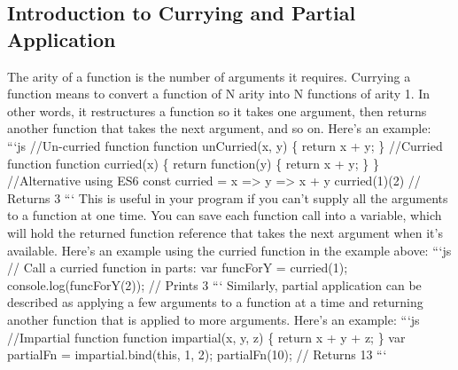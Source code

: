 \documentclass{article}%
\begin{document}
\subsection{Introduction to Currying and Partial Application}%
\label{subsec:IntroductiontoCurryingandPartialApplication}%
The arity of a function is the number of arguments it requires. Currying a function means to convert a function of N arity into N functions of arity 1.\newline%
In other words, it restructures a function so it takes one argument, then returns another function that takes the next argument, and so on.\newline%
Here's an example:\newline%
```js\newline%
//Un{-}curried function\newline%
function unCurried(x, y) \{\newline%
  return x + y;\newline%
\}\newline%
//Curried function\newline%
function curried(x) \{\newline%
  return function(y) \{\newline%
    return x + y;\newline%
  \}\newline%
\}\newline%
//Alternative using ES6\newline%
const curried = x => y => x + y\newline%
curried(1)(2) // Returns 3\newline%
```\newline%
This is useful in your program if you can't supply all the arguments to a function at one time. You can save each function call into a variable, which will hold the returned function reference that takes the next argument when it's available. Here's an example using the curried function in the example above:\newline%
```js\newline%
// Call a curried function in parts:\newline%
var funcForY = curried(1);\newline%
console.log(funcForY(2)); // Prints 3\newline%
```\newline%
Similarly, partial application can be described as applying a few arguments to a function at a time and returning another function that is applied to more arguments.\newline%
Here's an example:\newline%
```js\newline%
//Impartial function\newline%
function impartial(x, y, z) \{\newline%
  return x + y + z;\newline%
\}\newline%
var partialFn = impartial.bind(this, 1, 2);\newline%
partialFn(10); // Returns 13\newline%
```\newline%
\end{document}
